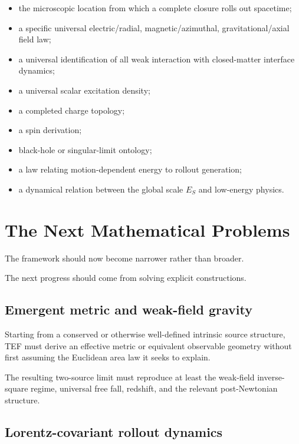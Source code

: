 \documentclass[10pt]{article}
\providecommand{\tightlist}{\setlength{\itemsep}{0pt}\setlength{\parskip}{0pt}}
\begin{document}
\begin{itemize}
\tightlist
\item
  the microscopic location from which a complete closure rolls out spacetime;
\item
  a specific universal electric/radial, magnetic/azimuthal, gravitational/axial field law;
\item
  a universal identification of all weak interaction with closed-matter interface dynamics;
\item
  a universal scalar excitation density;
\item
  a completed charge topology;
\item
  a spin derivation;
\item
  black-hole or singular-limit ontology;
\item
  a law relating motion-dependent energy to rollout generation;
\item
  a dynamical relation between the global scale \(E_S\) and low-energy physics.
\end{itemize}

\section{The Next Mathematical Problems}\label{the-next-mathematical-problems}

The framework should now become narrower rather than broader.

The next progress should come from solving explicit constructions.

\subsection{Emergent metric and weak-field gravity}\label{emergent-metric-and-weak-field-gravity}

Starting from a conserved or otherwise well-defined intrinsic source structure, TEF must derive an effective metric or equivalent observable geometry without first assuming the Euclidean area law it seeks to explain.

The resulting two-source limit must reproduce at least the weak-field inverse-square regime, universal free fall, redshift, and the relevant post-Newtonian structure.

\subsection{Lorentz-covariant rollout dynamics}\label{lorentz-covariant-rollout-dynamics}
\end{document}
